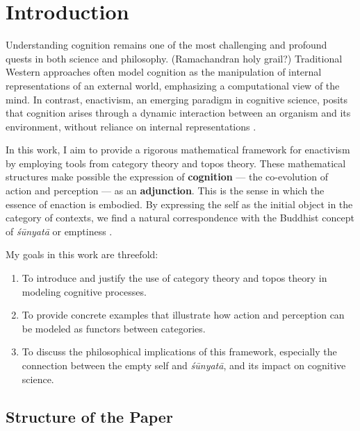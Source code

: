 \documentclass{article}
\begin{document}
\newpage




\tableofcontents

\section{Introduction}

Understanding cognition remains one of the most challenging and profound quests in both science and philosophy. (Ramachandran holy grail?) Traditional Western approaches often model cognition as the manipulation of internal representations of an external world, emphasizing a computational view of the mind. In contrast, enactivism, an emerging paradigm in cognitive science, posits that cognition arises through a dynamic interaction between an organism and its environment, without reliance on internal representations \cite{varela1991}.

In this work, I aim to provide a rigorous mathematical framework for enactivism by employing tools from category theory and topos theory. These mathematical structures make possible the expression of \textbf{cognition} --- the co-evolution of action and perception --- as an \textbf{adjunction}. This is the sense in which the essence of enaction is embodied. By expressing the self as the initial object in the category of contexts, we find a natural correspondence with the Buddhist concept of \emph{śūnyatā} or emptiness \cite{garfield1995}.

My goals in this work are threefold:

\begin{enumerate}
    \item To introduce and justify the use of category theory and topos theory in modeling cognitive processes.
    \item To provide concrete examples that illustrate how action and perception can be modeled as functors between categories.
    \item To discuss the philosophical implications of this framework, especially the connection between the empty self and \emph{śūnyatā}, and its impact on cognitive science.

\end{enumerate}

\subsection{Structure of the Paper}
\end{document}
